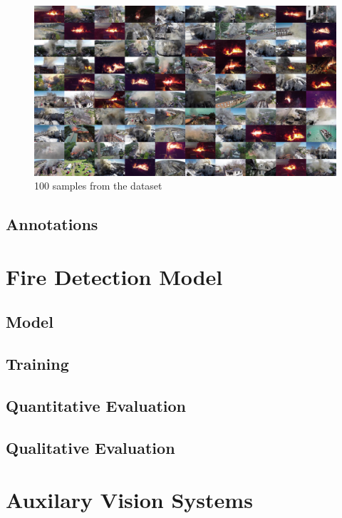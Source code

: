   \begin{figure}
    \includegraphics[width=\linewidth]{figures/lowres_100tiles.jpg}
    \caption{100 samples from the dataset}
  \end{figure}

  \subsection{Annotations}

\section{Fire Detection Model}\label{sec:detection}

  \subsection{Model}\label{sec:model}

  \subsection{Training}\label{sec:model}
    
  \subsection{Quantitative Evaluation}\label{sec:eval}

  \subsection{Qualitative Evaluation}\label{sec:gradcam}

\section{Auxilary Vision Systems}\label{sec:other}

